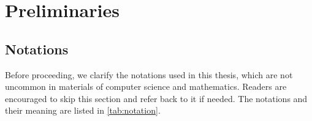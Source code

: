 \chapter{Preliminaries}\label{ch:Preliminaries}
\setcounter{figure}{0}


\section{Notations}\label{sec:notation}
Before proceeding, we clarify the notations used in this thesis, which are not uncommon in materials of computer science and mathematics. 
Readers are encouraged to skip this section and refer back to it if needed. 
The notations and their meaning are listed in \autoref{tab:notation}. 

